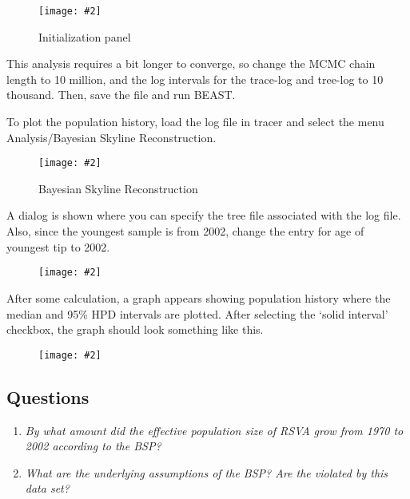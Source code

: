 \documentclass[12pt]{article}
\newcommand{\includeimage}[2][]{%
\texttt{[image: \#2]}
}
\begin{document}
\begin{figure}
\centering	
\includeimage[width=0.8\textwidth]{figures/BEAUti_init}
\label{fig:BEAUti_init}
\caption{Initialization panel}
\end{figure}


This analysis requires a bit longer to converge, so change the MCMC chain length to 10 million,
and the log intervals for the trace-log and tree-log to 10 thousand. 
Then, save the file and run BEAST.


To plot the population history, load the log file in tracer and select the menu 
Analysis/Bayesian Skyline Reconstruction.

\begin{figure}
\centering	
\includeimage[scale=0.3,clip=true,trim=0 300 0 0]{figures/tracerBSP1}
\label{fig:tracerBSP1}
\caption{Bayesian Skyline Reconstruction}
\end{figure}

A dialog is shown where you can specify the tree file associated with the log file.
Also, since the youngest sample is from 2002, change the entry for age of youngest
tip to 2002.

\begin{figure}
\centering	
\includeimage[width=0.5\textwidth]{figures/tracerBSP2}
\label{fig:tracerBSP2}
\end{figure}

After some calculation, a graph appears showing population history where the median
and 95\% HPD intervals are plotted. After selecting the `solid interval' checkbox, the
graph should look something like this.

\begin{figure}[h]
\centering	
\includeimage[width=0.5\textwidth]{figures/tracerBSP3}
\label{fig:tracerBSP3}
\end{figure}


\subsection*{Questions}
\begin{enumerate}
\item \textit{By what amount did the effective population size of RSVA grow from 1970 to 2002 according to the BSP?}
 

\item \textit{What are the underlying assumptions of the BSP? Are the violated by this data set?}
 
\end{enumerate}
\end{document}
